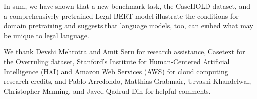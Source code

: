 \documentclass[sigconf]{acmart}
\begin{document}
In sum, we have shown that a new benchmark task, the CaseHOLD dataset, and a comprehensively pretrained Legal-BERT model illustrate the conditions for domain pretraining and suggests that language models, too, can embed what may be unique to legal language. 

\begin{acks}
    We thank Devshi Mehrotra and Amit Seru for research assistance, Casetext for the Overruling dataset, Stanford's Institute for Human-Centered Artificial Intelligence (HAI) and Amazon Web Services (AWS) for cloud computing research credits, and Pablo Arredondo, Matthias Grabmair, Urvashi Khandelwal, Christopher Manning, and Javed Qadrud-Din for helpful comments. 
\end{acks}



















\end{document}
